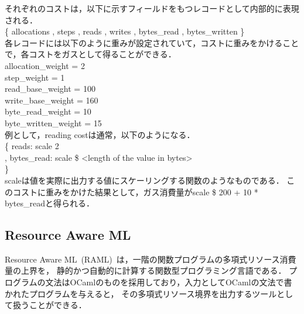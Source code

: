 \documentclass{kuisthesis}
\begin{document}
それぞれのコストは，以下に示すフィールドをもつレコードとして内部的に表現される．\\
\hspace{15pt}\{ allocations 
, steps 
, reads 
, writes 
, bytes\_read 
, bytes\_written 
\} \\
各レコードには以下のように重みが設定されていて，コストに重みをかけることで，各コストをガスとして得ることができる．\\
\hspace{15pt} allocation\_weight = 2 \\
\hspace{15pt} step\_weight = 1 \\
\hspace{15pt} read\_base\_weight = 100 \\
\hspace{15pt} write\_base\_weight = 160 \\
\hspace{15pt} byte\_read\_weight = 10 \\
\hspace{15pt} byte\_written\_weight = 15 \\
例として，reading costは通常，以下のようになる． \\
\hspace{15pt} \{ reads: scale 2 \\
\hspace{15pt} , bytes\_read: scale \$ <length of the value in bytes> \\
\hspace{15pt} \} \\
scaleは値を実際に出力する値にスケーリングする関数のようなものである．
このコストに重みをかけた結果として，ガス消費量がscale \$ 200 + 10 * bytes\_readと得られる．




\subsection{Resource Aware ML}\label{subsec-pre-raml}
Resource Aware ML\ (RAML)\ は，一階の関数プログラムの多項式リソース消費量の上界を，
静的かつ自動的に計算する関数型プログラミング言語である．
プログラムの文法はOCamlのものを採用しており，入力としてOCamlの文法で書かれたプログラムを与えると，
その多項式リソース境界を出力するツールとして扱うことができる．
\end{document}
